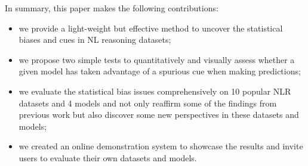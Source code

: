 In summary, this paper makes the following contributions:
\begin{itemize}
\item we provide a light-weight but effective method to uncover
the statistical biases and cues in NL reasoning datasets;

\item we propose two simple tests to quantitatively and visually
assess whether a given model has taken advantage of a
spurious cue when making predictions;

\item we evaluate the statistical bias issues comprehensively on
10 popular NLR datasets and 4 models and not only reaffirm
some of the findings from previous work but also discover some
new perspectives in these datasets and models;

\item we created an online demonstration system to showcase
the results and invite users to evaluate their own datasets and models.
\end{itemize}








